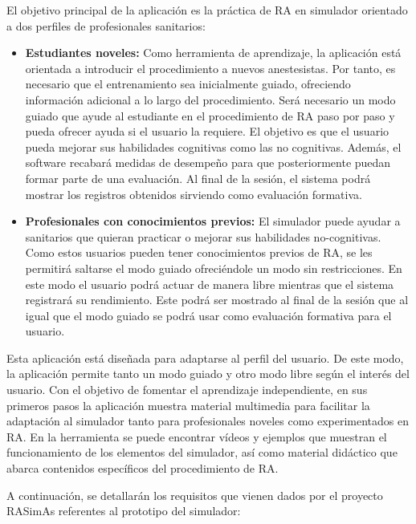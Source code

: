 El objetivo principal de la aplicación es la práctica de \ac{RA} en simulador orientado a dos perfiles de profesionales sanitarios:
\begin{itemize}
    \item \textbf{Estudiantes noveles:} Como herramienta de aprendizaje, la aplicación está orientada a introducir el procedimiento a nuevos anestesistas. Por tanto, es necesario que el entrenamiento sea inicialmente guiado, ofreciendo información adicional a lo largo del procedimiento. Será necesario un modo guiado que ayude al estudiante en el procedimiento de \ac{RA} paso por paso y pueda ofrecer ayuda si el usuario la requiere. El objetivo es que el usuario pueda mejorar sus habilidades cognitivas como las no cognitivas. Además, el software recabará medidas de desempeño para que posteriormente puedan formar parte de una evaluación. Al final de la sesión, el sistema podrá mostrar los registros obtenidos sirviendo como evaluación formativa.

\item \textbf{Profesionales con conocimientos previos:} El simulador puede ayudar a sanitarios que quieran practicar o mejorar sus habilidades no-cognitivas. Como estos usuarios pueden tener conocimientos previos de \ac{RA}, se les permitirá saltarse el modo guiado ofreciéndole un modo sin restricciones. En este modo el usuario podrá actuar de manera libre mientras que el sistema registrará su rendimiento. Este podrá ser mostrado al final de la sesión que al igual que el modo guiado se podrá usar como evaluación formativa para el usuario.

\end{itemize}


Esta aplicación está diseñada para adaptarse al perfil del usuario. De este modo, la aplicación permite tanto un modo guiado y otro modo libre según el interés del usuario. 
Con el objetivo de fomentar el aprendizaje independiente, en sus primeros pasos la aplicación muestra material multimedia para facilitar la adaptación al simulador tanto para profesionales noveles como experimentados en \ac{RA}. En la herramienta se puede encontrar vídeos y ejemplos que muestran el funcionamiento de los elementos del simulador, así como material didáctico que abarca contenidos específicos del procedimiento de \ac{RA}.



A continuación, se detallarán los requisitos que vienen dados por el proyecto \ac{RASimAs} referentes al prototipo del simulador:


